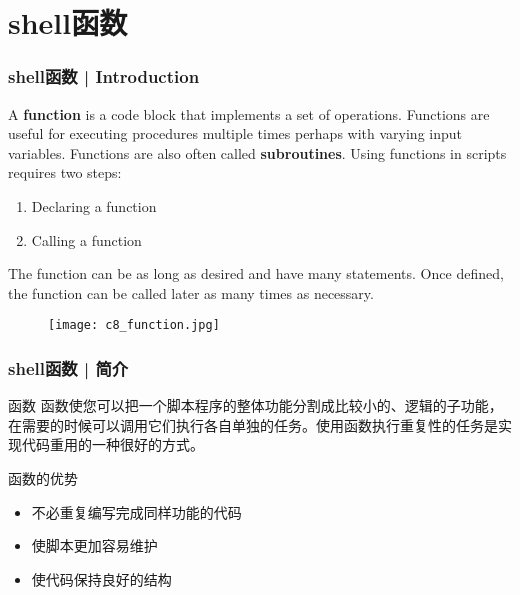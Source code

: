 \section{shell函数}
\begin{frame}
  \frametitle{shell函数 | Introduction}
  A \textbf{function} is a code block that implements a set of operations.  Functions are useful for executing procedures multiple times perhaps with varying input variables. Functions are also often called \textbf{subroutines}. Using functions in scripts requires two steps:
  \begin{enumerate}
    \item Declaring a function
    \item Calling a function
  \end{enumerate}
  The function can be as long as desired and have many statements. Once defined, the function can be called later as many times as necessary.
  \begin{figure}
    \centering
    \texttt{[image: c8\_function.jpg]}
  \end{figure}
\end{frame}

\begin{frame}
  \frametitle{shell函数 | 简介}
  \begin{block}{函数}
    函数使您可以把一个脚本程序的整体功能分割成比较小的、逻辑的子功能，在需要的时候可以调用它们执行各自单独的任务。使用函数执行重复性的任务是实现代码重用的一种很好的方式。
  \end{block}
  \pause
  \begin{block}{函数的优势}
    \begin{itemize}
      \item 不必重复编写完成同样功能的代码
      \item 使脚本更加容易维护
      \item 使代码保持良好的结构
    \end{itemize}
  \end{block}
\end{frame}

